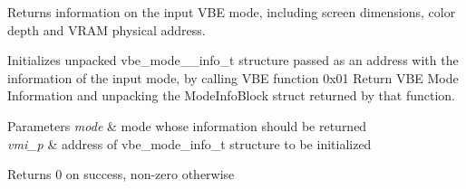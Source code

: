 Returns information on the input V\+BE mode, including screen dimensions, color depth and V\+R\+AM physical address. 

Initializes unpacked vbe\+\_\+mode\+\_\+\+\_\+info\+\_\+t structure passed as an address with the information of the input mode, by calling V\+BE function 0x01 Return V\+BE Mode Information and unpacking the Mode\+Info\+Block struct returned by that function.


\begin{DoxyParams}{Parameters}
{\em mode} & mode whose information should be returned \\
\hline
{\em vmi\+\_\+p} & address of vbe\+\_\+mode\+\_\+info\+\_\+t structure to be initialized \\
\hline
\end{DoxyParams}
\begin{DoxyReturn}{Returns}
0 on success, non-\/zero otherwise 
\end{DoxyReturn}
